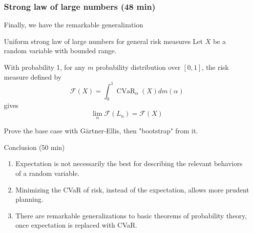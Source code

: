 \documentclass{beamer}
\newcommand{\cvar}{\ensuremath{\operatorname{CVaR}}}
\begin{document}
\begin{frame}
	\frametitle{Strong law of large numbers (48 min)}
	Finally, we have the remarkable generalization
	\begin{block}{Uniform strong law of large numbers for general risk measures}
	Let $X$ be a random variable with bounded range.
	
	\alert{With probability 1}, for any $m$ probability distribution over $[0, 1]$, the risk measure defined by 
	$$\mathcal{F}(X) = \int_0^1 \cvar_\alpha(X) dm(\alpha)$$
	gives
	$$\lim_n\mathcal{F}(L_n) = \mathcal{F}(X)$$
	\end{block}
	Prove the base case with G\"artner-Ellis, then "bootstrap" from it. 
\end{frame}



\begin{frame}{Conclusion (50 min)}
\begin{enumerate}
	\item Expectation is not necessarily the best for describing the relevant behaviors of a random variable. \pause
	\item Minimizing the CVaR of risk, instead of the expectation, allows more prudent planning. \pause
	\item There are remarkable generalizations to basic theorems of probability theory, once expectation is replaced with CVaR.
\end{enumerate}
\end{frame}



\end{document}
